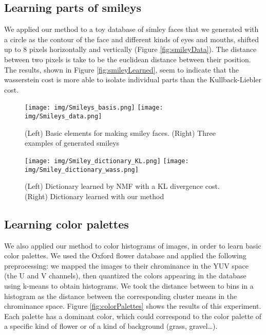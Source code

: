\subsection{Learning parts of smileys}

We applied our method to a toy database of simley faces that we generated with a circle as the contour of the face and different kinds of eyes and mouths, shifted up to 8 pixels horizontally and vertically (Figure \ref{fig:smileyData}). The distance between two pixels is take to be the euclidean distance between their position. The results, shown in Figure \ref{fig:smileyLearned}, seem to indicate that the wasserstein cost is more able to isolate individual parts than the Kullback-Liebler cost.

\begin{figure}[ht]
\center\texttt{[image: img/Smileys\_basis.png]}
\texttt{[image: img/Smileys\_data.png]}
\label{ig:smileyLearned}
\caption{(Left) Basic elements for making smiley faces. (Right) Three examples of generated smileys}
\end{figure}

\begin{figure}[ht]
\center\texttt{[image: img/Smiley\_dictionary\_KL.png]}
\hspace{.08\linewidth}
\texttt{[image: img/Smiley\_dictionary\_wass.png]}
\label{ig:smileyLearned}
\caption{(Left) Dictionary learned by NMF with a KL divergence cost. (Right) Dictionary learned with our method}
\end{figure}

\subsection{Learning color palettes}

We also applied our method to color histograms of images, in order to learn basic color palettes. We used the Oxford flower database and applied the following preprocessing: we mapped the images to their chrominance in the YUV space (the U and V channels), then quantized the colors appearing in the database using k-means to obtain histograms. We took the distance between to bins in a histogram as the distance between the corresponding cluster means in the chrominance space. Figure \ref{fig:colorPalettes} shows the results of this experiment. Each palette has a dominant color, which could correspond to the color palette of a specific kind of flower or of a kind of background (grass, gravel\dots).

